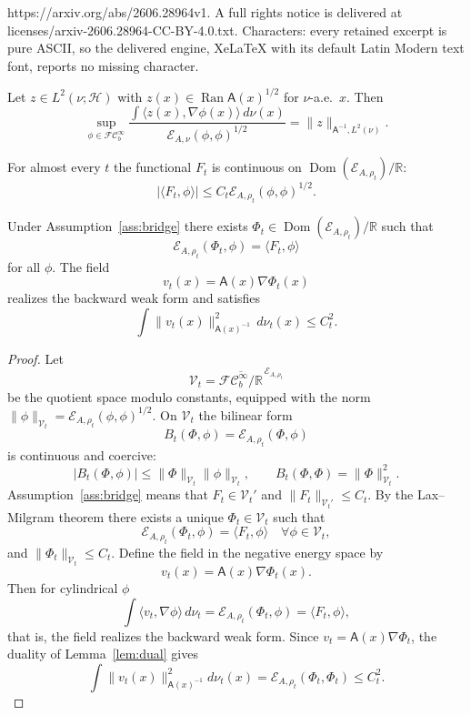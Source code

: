 \documentclass[10pt,a4paper]{amsart}
\newcommand{\Asf}{\mathsf A}
\newcommand{\Dom}{\operatorname{Dom}}
\newcommand{\FC}{\mathcal{FC}_b^\infty}
\newcommand{\Hh}{\mathcal H}
\newcommand{\Ran}{\operatorname{Ran}}
\begin{document}
https://arxiv.org/abs/2606.28964v1. A full rights notice is delivered at licenses/arxiv-2606.28964-CC-BY-4.0.txt. Characters: every retained excerpt is pure ASCII, so the delivered engine, XeLaTeX with its default Latin Modern text font, reports no missing character.
\begin{lemma}
\label{lem:dual}
Let \(z\in L^2(\nu;\Hh)\) with
\(z(x)\in\Ran \Asf(x)^{1/2}\) for \(\nu\)-a.e.\ \(x\). Then
\[
        \sup_{\phi\in\FC}
        \frac{\int\langle z(x),\nabla\phi(x)\rangle\,d\nu(x)}
        {\mathcal E_{A,\nu}(\phi,\phi)^{1/2}}
        =
        \|z\|_{\Asf^{-1},L^2(\nu)} .
\]
\end{lemma}

\begin{assumption}
\label{ass:bridge}
For almost every \(t\) the functional \(F_t\) is continuous on
\(\Dom(\mathcal E_{A,\rho_t})/\mathbb R\):
\[
        |\langle F_t,\phi\rangle|
        \le C_t\mathcal E_{A,\rho_t}(\phi,\phi)^{1/2}.
\]
\end{assumption}

\begin{theorem}
\label{thm:bridge}
Under Assumption~\ref{ass:bridge} there exists
\(\Phi_t\in\Dom(\mathcal E_{A,\rho_t})/\mathbb R\) such that
\[
        \mathcal E_{A,\rho_t}(\Phi_t,\phi)=\langle F_t,\phi\rangle
\]
for all \(\phi\). The field
\[
        v_t(x)=\Asf(x)\nabla\Phi_t(x)
\]
realizes the backward weak form and satisfies
\[
        \int\|v_t(x)\|_{\Asf(x)^{-1}}^2\,d\nu_t(x)
        \le C_t^2.
\]
\end{theorem}

\begin{proof}
Let
\[
        \mathcal V_t=\overline{\FC/\mathbb R}^{\,\mathcal E_{A,\rho_t}}
\]
be the quotient space modulo constants, equipped with the norm
\(\|\phi\|_{\mathcal V_t}=\mathcal E_{A,\rho_t}(\phi,\phi)^{1/2}\). On
\(\mathcal V_t\) the bilinear form
\[
        B_t(\Phi,\phi)=\mathcal E_{A,\rho_t}(\Phi,\phi)
\]
is continuous and coercive:
\[
        |B_t(\Phi,\phi)|\le \|\Phi\|_{\mathcal V_t}\|\phi\|_{\mathcal V_t},
        \qquad
        B_t(\Phi,\Phi)=\|\Phi\|_{\mathcal V_t}^2 .
\]
Assumption~\ref{ass:bridge} means that \(F_t\in\mathcal V_t'\) and
\(\|F_t\|_{\mathcal V_t'}\le C_t\). By the Lax--Milgram theorem there exists a
unique \(\Phi_t\in\mathcal V_t\) such that
\[
        \mathcal E_{A,\rho_t}(\Phi_t,\phi)=\langle F_t,
\phi\rangle
        \quad\forall\phi\in\mathcal V_t,
\]
and \(\|\Phi_t\|_{\mathcal V_t}\le C_t\). Define the field in the negative
energy space by
\[
        v_t(x)=\Asf(x)\nabla\Phi_t(x).
\]
Then for cylindrical \(\phi\)
\[
        \int\langle v_t,\nabla\phi\rangle\,d\nu_t
        =\mathcal E_{A,\rho_t}(\Phi_t,
\phi)=\langle F_t,
\phi\rangle,
\]
that is, the field realizes the backward weak form. Since \(v_t=\Asf(x)\nabla\Phi_t\), the duality of
Lemma~\ref{lem:dual} gives
\[
        \int\|v_t(x)\|_{\Asf(x)^{-1}}^2d\nu_t(x)
        =\mathcal E_{A,\rho_t}(\Phi_t,
\Phi_t)
        \le C_t^2.
\]
\end{proof}
\end{document}
